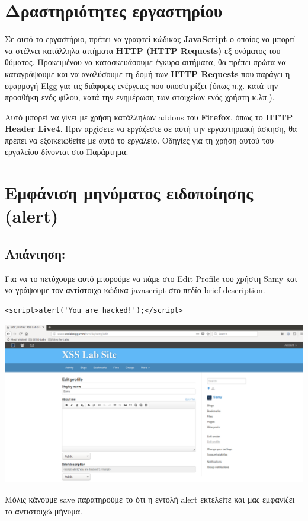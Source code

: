 %
%
\setcounter{section}{0}
\section*{Δραστηριότητες εργαστηρίου}


\noindent
Σε αυτό το εργαστήριο, πρέπει να γραφτεί κώδικας \textbf{JavaScript} ο οποίος να μπορεί να στέλνει
κατάλληλα αιτήματα \textbf{HTTP (HTTP Requests)} εξ ονόματος του θύματος. Προκειμένου να
κατασκευάσουμε έγκυρα αιτήματα, θα πρέπει πρώτα να καταγράψουμε και να αναλύσουμε
τη δομή των \textbf{HTTP Requests} που παράγει η εφαρμογή Elgg για τις διάφορες ενέργειες
που υποστηρίζει (όπως π.χ. κατά την προσθήκη ενός φίλου, κατά την ενημέρωση των
στοιχείων ενός χρήστη κ.λπ.).

\noindent
Αυτό μπορεί να γίνει με χρήση κατάλληλων addons του \textbf{Firefox}, όπως το
\textbf{HTTP Header Live4}. Πριν αρχίσετε να εργάζεστε σε αυτή την εργαστηριακή άσκηση,
θα πρέπει να εξοικειωθείτε με αυτό το εργαλείο. Οδηγίες για τη χρήση αυτού του
εργαλείου δίνονται στο Παράρτημα.

\section{Εμφάνιση μηνύματος ειδοποίησης (alert)}
\subsection*{Απάντηση:}
\noindent
Για να το πετύχουμε αυτό μπορούμε να πάμε στο Εdit Profile του
χρήστη Samy και να γράψουμε τον αντίστοιχο κώδικα javascript στο
πεδίο brief description.

\begin{center}
	\begin{lstlisting}	
<script>alert('You are hacked!');</script>
	\end{lstlisting}	
\end{center}

\begin{center}
			\includegraphics[width=1\textwidth]{image/1.1.PNG}		
\end{center}
\noindent
Μόλις κάνουμε save παρατηρούμε το ότι η εντολή alert εκτελείτε
και μας εμφανίζει το αντιστοιχώ μήνυμα.

